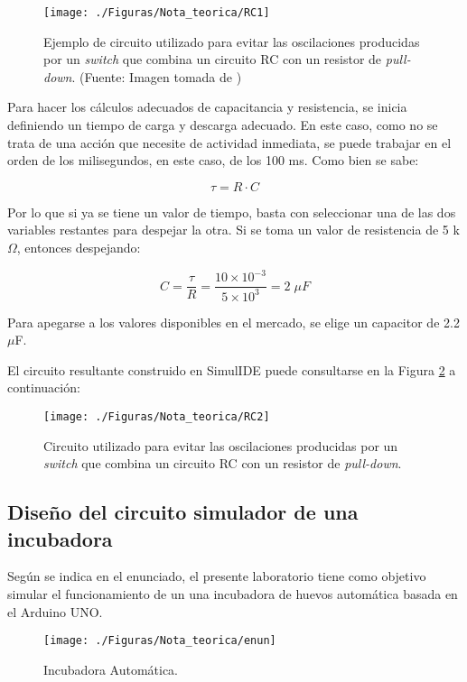 \begin{figure}[H]
\centering
\texttt{[image: ./Figuras/Nota\_teorica/RC1]}
\caption{Ejemplo de circuito utilizado para evitar las oscilaciones producidas por un \textit{switch} que combina un circuito RC con un resistor de \textit{pull-down}. (Fuente: Imagen tomada de \cite{RC})}
\label{fig:RC1}
\end{figure}

Para hacer los cálculos adecuados de capacitancia y resistencia, se inicia definiendo un tiempo de carga y descarga adecuado. En este caso, como no se trata de una acción que necesite de actividad inmediata, se puede trabajar en el orden de los milisegundos, en este caso, de los 100 ms. Como bien se sabe: 

\begin{equation}
    \tau = R \cdot C
\end{equation}

Por lo que si ya se tiene un valor de tiempo, basta con seleccionar una de las dos variables restantes para despejar la otra. Si se toma un valor de resistencia de 5 k$\Omega$, entonces despejando:

\begin{equation}
    C = \frac{\tau}{R} = \frac{10 \times 10^{-3}}{5 \times 10^{3}} = 2 \; \mu F
\end{equation}

\noindent Para apegarse a los valores disponibles en el mercado, se elige un capacitor de 2.2 $\mu$F. 

El circuito resultante construido en SimulIDE puede consultarse en la Figura \ref{fig:RC2} a continuación: 

\begin{figure}[H]
\centering
\texttt{[image: ./Figuras/Nota\_teorica/RC2]}
\caption{Circuito utilizado para evitar las oscilaciones producidas por un \textit{switch} que combina un circuito RC con un resistor de \textit{pull-down}.}
\label{fig:RC2}
\end{figure}



\subsection{Diseño del circuito simulador de una incubadora} \label{sec:cir2}
Según se indica en el enunciado, el presente laboratorio tiene como objetivo simular el funcionamiento de un una incubadora de huevos automática basada en el Arduino UNO. 
\begin{figure}[H]
\centering
\texttt{[image: ./Figuras/Nota\_teorica/enun]}
\caption{Incubadora Automática.}
\label{fig:enun}
\end{figure}

